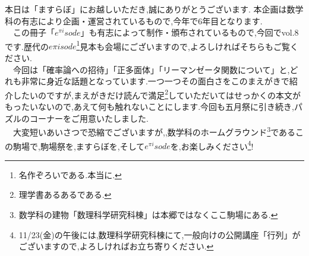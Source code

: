 
本日は「ますらぼ」にお越しいただき,誠にありがとうございます.
本企画は数学科の有志により企画・運営されているもので,今年で6年目となります.\\
　この冊子「$e^{\pi i}sode$」も有志によって制作・頒布されているもので,今回でvol.8です.歴代の$e{\pi i}sode$\footnote{名作ぞろいである.本当に.}見本も会場にございますので,よろしければそちらもご覧ください.\\
　今回は「確率論への招待」「正多面体」「リーマンゼータ関数について」と,どれも非常に身近な話題となっています.一つ一つその面白さをこのまえがきで紹介したいのですが,まえがきだけ読んで満足\footnote{理学書あるあるである.}していただいてはせっかくの本文がもったいないので,あえて何も触れないことにします.今回も五月祭に引き続き,パズルのコーナーをご用意いたしました.\\
　大変短いあいさつで恐縮でございますが,,数学科のホームグラウンド\footnote{数学科の建物「数理科学研究科棟」は本郷ではなくここ駒場にある.}であるこの駒場で,駒場祭を,ますらぼを,そして$e^{\pi i}sode$を,お楽しみください\footnote{11/23(金)の午後には,数理科学研究科棟にて,一般向けの公開講座「行列」がございますので,よろしければお立ち寄りください.}!
